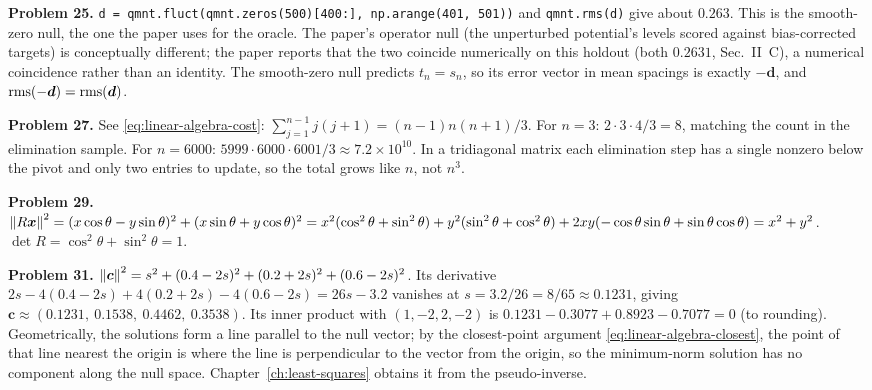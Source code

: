 \textbf{Problem 25.} \texttt{d = qmnt.fluct(qmnt.zeros(500)[400:], np.arange(401, 501))} and \texttt{qmnt.rms(d)} give about $0.263$. This is the smooth-zero null, the one the paper uses for the oracle. The paper's operator null (the unperturbed potential's levels scored against bias-corrected targets) is conceptually different; the paper reports that the two coincide numerically on this holdout (both $0.2631$, Sec.~II~C), a numerical coincidence rather than an identity. The smooth-zero null predicts $t_n=s_n$, so its error vector in mean spacings is exactly $-\bm d$, and $\mathrm{rms}(-\bm d)=\mathrm{rms}(\bm d)$.

\textbf{Problem 27.} See \cref{eq:linear-algebra-cost}: $\sum_{j=1}^{n-1}j(j+1)=(n-1)n(n+1)/3$. For $n=3$: $2\cdot3\cdot4/3=8$, matching the count in the elimination sample. For $n=6000$: $5999\cdot6000\cdot6001/3\approx7.2\times10^{10}$. In a tridiagonal matrix each elimination step has a single nonzero below the pivot and only two entries to update, so the total grows like $n$, not $n^3$.

\textbf{Problem 29.} $\left\lVert R\bm x\right\rVert^2=(x\cos\theta-y\sin\theta)^2+(x\sin\theta+y\cos\theta)^2=x^2(\cos^2\theta+\sin^2\theta)+y^2(\sin^2\theta+\cos^2\theta)+2xy(-\cos\theta\sin\theta+\sin\theta\cos\theta)=x^2+y^2$. $\det R=\cos^2\theta+\sin^2\theta=1$.

\textbf{Problem 31.} $\left\lVert \bm c\right\rVert^2=s^2+(0.4-2s)^2+(0.2+2s)^2+(0.6-2s)^2$. Its derivative $2s-4(0.4-2s)+4(0.2+2s)-4(0.6-2s)=26s-3.2$ vanishes at $s=3.2/26=8/65\approx0.1231$, giving $\bm c\approx(0.1231,\ 0.1538,\ 0.4462,\ 0.3538)$. Its inner product with $(1,-2,2,-2)$ is $0.1231-0.3077+0.8923-0.7077=0$ (to rounding). Geometrically, the solutions form a line parallel to the null vector; by the closest-point argument \cref{eq:linear-algebra-closest}, the point of that line nearest the origin is where the line is perpendicular to the vector from the origin, so the minimum-norm solution has no component along the null space. Chapter~\ref{ch:least-squares} obtains it from the pseudo-inverse.
